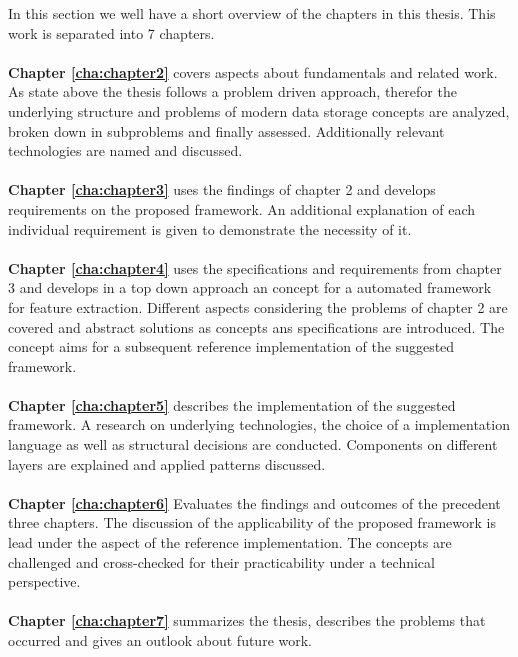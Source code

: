 In this section we well have a short overview of the chapters in this thesis. This work is separated into 7 chapters.
\\\\
\textbf{Chapter \ref{cha:chapter2}} covers aspects about fundamentals and related work. As state above the thesis follows a problem driven approach, therefor the underlying structure and problems of modern data storage concepts are analyzed, broken down in subproblems and finally assessed. Additionally relevant technologies are named and discussed.
\\\\
\textbf{Chapter \ref{cha:chapter3}} uses the findings of chapter 2 and develops requirements on the proposed framework. An additional explanation of each individual requirement is given to demonstrate the necessity of it.
\\\\
\textbf{Chapter \ref{cha:chapter4}} uses the specifications and requirements from chapter 3 and develops in a top down approach an concept for a automated framework for feature extraction. Different aspects considering the problems of chapter 2 are covered and abstract solutions as concepts ans specifications are introduced. The concept aims for a subsequent reference implementation of the suggested framework.
\\\\
\textbf{Chapter \ref{cha:chapter5}} describes the implementation of the suggested framework. A research on underlying technologies, the choice of a implementation language as well as structural decisions are conducted. Components on different layers are explained and applied patterns discussed. 
\\\\
\textbf{Chapter \ref{cha:chapter6}} Evaluates the findings and outcomes of the precedent three chapters. The discussion of the applicability of the proposed framework is lead under the aspect of the reference implementation. The concepts are challenged and cross-checked for their  practicability under a technical perspective.
\\\\
\textbf{Chapter \ref{cha:chapter7}} summarizes the thesis, describes the problems that occurred and gives an outlook about future work.